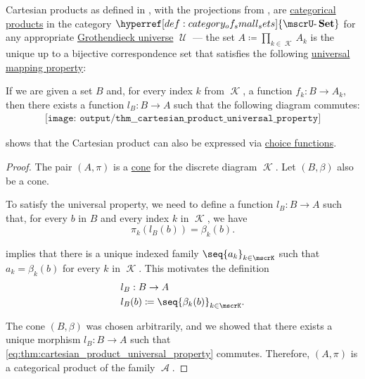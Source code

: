 \begin{theorem}\label{thm:cartesian_product_universal_property}
  Cartesian products as defined in , with the projections from , are \hyperref[def:discrete_category_limits]{categorical products} in the category \( \hyperref[def:category_of_small_sets]{\ucat{Set}} \) for any appropriate \hyperref[def:grothendieck_universe]{Grothendieck universe} \( \mscrU \) --- the set \( A \coloneqq \prod_{k \in \mscrK} A_k \) is the unique up to a bijective correspondence set that satisfies the following \hyperref[rem:universal_mapping_property]{universal mapping property}:
  \begin{displayquote}
    If we are given a set \( B \) and, for every index \( k \) from \( \mscrK \), a function \( f_k: B \to A_k \), then there exists a function \( l_B: B \to A \) such that the following diagram commutes:
    \begin{equation}\label{eq:thm:cartesian_product_universal_property}
      \begin{aligned}
        \texttt{[image: output/thm\_\_cartesian\_product\_universal\_property]}
      \end{aligned}
    \end{equation}
  \end{displayquote}
\end{theorem}
\begin{comments}
  \item {} shows that the Cartesian product can also be expressed via \hyperref[def:choice_function]{choice functions}.
\end{comments}
\begin{proof}
  The pair \( (A, \pi) \) is a \hyperref[def:category_of_cones/cone]{cone} for the discrete diagram \( \mscrK \). Let \( (B, \beta) \) also be a cone.

  To satisfy the universal property, we need to define a function \( l_B: B \to A \) such that, for every \( b \) in \( B \) and every index \( k \) in \( \mscrK \), we have
  \begin{equation*}
    \pi_k(l_B(b)) = \beta_k(b).
  \end{equation*}

   implies that there is a unique indexed family \( \seq{ a_k }_{k \in \mscrK} \) such that \( a_k = \beta_k(b) \) for every \( k \) in \( \mscrK \). This motivates the definition
  \begin{equation*}
    \begin{aligned}
      &l_B: B \to A \\
      &l_B(b) \coloneqq \seq{ \beta_k(b) }_{k \in \mscrK}.
    \end{aligned}
  \end{equation*}

  The cone \( (B, \beta) \) was chosen arbitrarily, and we showed that there exists a unique morphism \( l_B: B \to A \) such that \eqref{eq:thm:cartesian_product_universal_property} commutes. Therefore, \( (A, \pi) \) is a categorical product of the family \( \mscrA \).
\end{proof}

